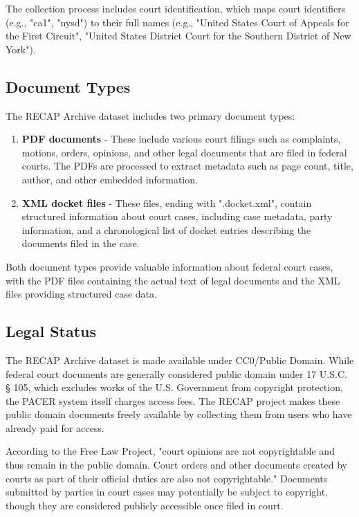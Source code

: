 The collection process includes court identification, which maps court identifiers (e.g., "ca1", "nysd") to their full names (e.g., "United States Court of Appeals for the First Circuit", "United States District Court for the Southern District of New York").

\subsection{Document Types}

The RECAP Archive dataset includes two primary document types:

\begin{enumerate}
    \item \textbf{PDF documents} - These include various court filings such as complaints, motions, orders, opinions, and other legal documents that are filed in federal courts. The PDFs are processed to extract metadata such as page count, title, author, and other embedded information.
    
    \item \textbf{XML docket files} - These files, ending with ".docket.xml", contain structured information about court cases, including case metadata, party information, and a chronological list of docket entries describing the documents filed in the case.
\end{enumerate}

Both document types provide valuable information about federal court cases, with the PDF files containing the actual text of legal documents and the XML files providing structured case data.

\subsection{Legal Status}

The RECAP Archive dataset is made available under CC0/Public Domain. While federal court documents are generally considered public domain under 17 U.S.C. § 105, which excludes works of the U.S. Government from copyright protection, the PACER system itself charges access fees. The RECAP project makes these public domain documents freely available by collecting them from users who have already paid for access.

According to the Free Law Project, "court opinions are not copyrightable and thus remain in the public domain. Court orders and other documents created by courts as part of their official duties are also not copyrightable." Documents submitted by parties in court cases may potentially be subject to copyright, though they are considered publicly accessible once filed in court.

